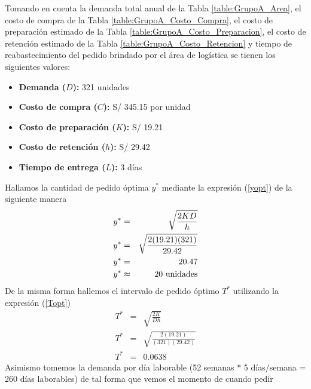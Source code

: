 Tomando en cuenta la demanda total anual de la Tabla \ref{table:GrupoA_Area}, el costo de compra de la Tabla \ref{table:GrupoA_Costo_Compra}, el costo de preparación estimado de la Tabla \ref{table:GrupoA_Costo_Preparacion}, el costo de retención estimado de la Tabla \ref{table:GrupoA_Costo_Retencion} y tiempo de reabastecimiento del pedido brindado por el área de logística se tienen los siguientes valores:

\begin{itemize}
    \item \textbf{Demanda ($D$):} 321 unidades
    \item \textbf{Costo de compra ($C$):} S/ 345.15 por unidad
    \item \textbf{Costo de preparación ($K$):} S/ 19.21
    \item \textbf{Costo de retención ($h$):} S/ 29.42
    \item \textbf{Tiempo de entrega ($L$):} 3 días
\end{itemize}

Hallamos la cantidad de pedido óptima $y^*$ mediante la expresión (\ref{yopt}) de la siguiente manera
\begin{eqnarray}
    y^* &=& \sqrt{\frac{2KD}{h}} \nonumber \\
    y^* &=& \sqrt{\frac{2(19.21)(321)}{29.42}} \nonumber \\
    y^* &=& 20.47 \nonumber \\
    y^* &\thickapprox& 20 \text{ unidades} \nonumber
\end{eqnarray}
De la misma forma hallemos el intervalo de pedido óptimo $T^*$ utilizando la expresión (\ref{Topt}) 
\begin{eqnarray}
    T^* &=& \sqrt{\frac{2K}{Dh}} \nonumber \\
    T^* &=& \sqrt{\frac{2(19.21)}{(321)(29.42)}} \nonumber \\
    T^* &=& 0.0638 \nonumber
\end{eqnarray}
Asimismo tomemos la demanda por día laborable (52 semanas * 5 días/semana = 260 días laborables) de tal forma que vemos el momento de cuando pedir


